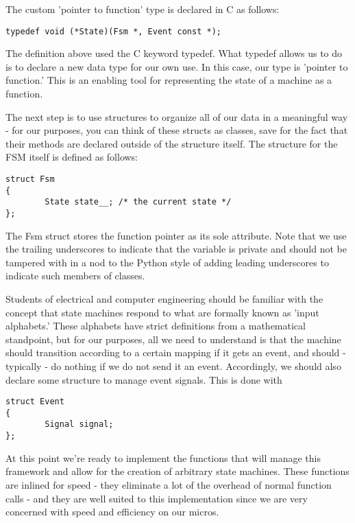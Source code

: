The custom 'pointer to function' type is declared in C as follows:
\begin{lstlisting}
typedef void (*State)(Fsm *, Event const *);
\end{lstlisting}

The definition above used the C keyword typedef. What typedef allows us to do is to declare a new data type for our own use. In this case, our type is 'pointer to function.' This is an enabling tool for representing the state of a machine as a function.

The next step is to use structures to organize all of our data in a meaningful way - for our purposes, you can think of these structs as classes, save for the fact that their methods are declared outside of the structure itself. The structure for the FSM itself is defined as follows:

\begin{lstlisting}
struct Fsm
{      
        State state__; /* the current state */
};
\end{lstlisting}

The Fsm struct stores the function pointer as its sole attribute. Note that we use the trailing underscores to indicate that the variable is private and should not be tampered with in a nod to the Python style of adding leading underscores to indicate such members of classes. 

Students of electrical and computer engineering should be familiar with the concept that state machines respond to what are formally known as 'input alphabets.' These alphabets have strict definitions from a mathematical standpoint, but for our purposes, all we need to understand is that the machine should transition according to a certain mapping if it gets an event, and should - typically - do nothing if we do not send it an event. Accordingly, we should also declare some structure to manage event signals. This is done with

\begin{lstlisting}
struct Event
{
        Signal signal;
};
\end{lstlisting}

At this point we're ready to implement the functions that will manage this framework and allow for the creation of arbitrary state machines. These functions are inlined for speed - they eliminate a lot of the overhead of normal function calls - and they are well suited to this implementation since we are very concerned with speed and efficiency on our micros.

